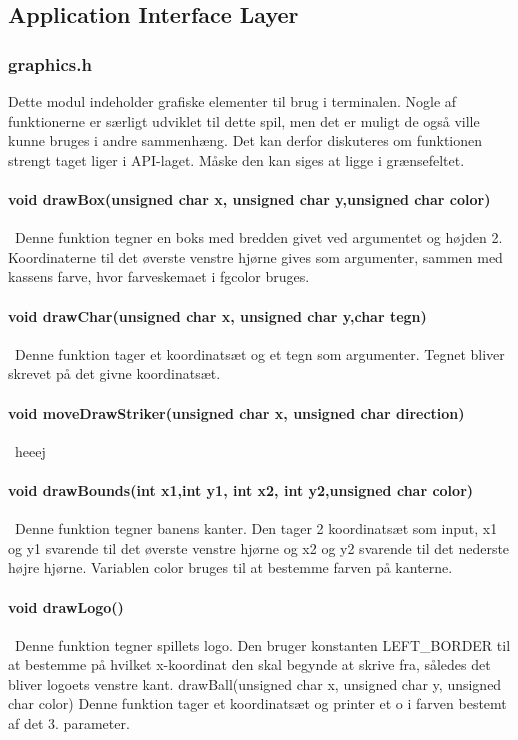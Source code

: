 \subsection{Application Interface Layer}
\subsubsection{graphics.h}
Dette modul indeholder grafiske elementer til brug i terminalen. Nogle af funktionerne er særligt udviklet til dette spil, men det er muligt de også ville kunne bruges i andre sammenhæng.  Det kan derfor diskuteres om funktionen strengt taget liger i API-laget. Måske den kan siges at ligge i grænsefeltet.
\paragraph{
void drawBox(unsigned char x, unsigned char y,unsigned char color)}\
Denne funktion tegner en boks med bredden givet ved argumentet og højden 2. Koordinaterne til det øverste venstre hjørne gives som argumenter, sammen med kassens farve, hvor farveskemaet i fgcolor bruges.

\paragraph{void drawChar(unsigned char x, unsigned char y,char tegn)}\
Denne funktion tager et koordinatsæt og et tegn som argumenter. Tegnet bliver skrevet på det givne koordinatsæt.

\paragraph{void moveDrawStriker(unsigned char x, unsigned char direction)}\
heeej

\paragraph{void drawBounds(int x1,int y1, int x2, int y2,unsigned char color)}\
Denne funktion tegner banens kanter. Den tager 2 koordinatsæt som input, x1 og y1 svarende til det øverste venstre hjørne og  x2 og y2 svarende til det nederste højre hjørne. Variablen color bruges til at bestemme farven på kanterne. 

\paragraph{void drawLogo()}\
Denne funktion tegner spillets logo. Den bruger konstanten LEFT\_BORDER til at bestemme på hvilket x-koordinat den skal begynde at skrive fra, således det bliver logoets venstre kant.
drawBall(unsigned char x, unsigned char y, unsigned char color)
Denne funktion tager et koordinatsæt og printer et o i farven bestemt af det 3. parameter.

